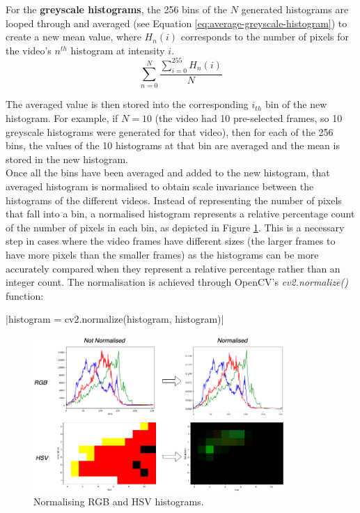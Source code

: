 For the \textbf{greyscale histograms}, the 256 bins of the $N$ generated histograms are looped through and averaged (see Equation \ref{eq:average-greyscale-histogram}) to create a new mean value, where $H_n(i)$ corresponds to the number of pixels for the video's $n^{th}$ histogram at intensity $i$.
\begin{equation}
\label{eq:average-greyscale-histogram}
    \sum_{n=0}^{N} \frac{\sum_{i=0}^{255} H_n(i)}{N}
\end{equation}

The averaged value is then stored into the corresponding $i_{th}$ bin of the new histogram. For example, if $N=10$ (the video had 10 pre-selected frames, so 10 greyscale histograms were generated for that video), then for each of the 256 bins, the values of the 10 histograms at that bin are averaged and the mean is stored in the new histogram.\\

Once all the bins have been averaged and added to the new histogram, that averaged histogram is normalised to obtain scale invariance between the histograms of the different videos. Instead of representing the number of pixels that fall into a bin, a normalised histogram represents a relative percentage count of the number of pixels in each bin, as depicted in Figure \ref{fig:implementation-normalise-histogram}. This is a necessary step in cases where the video frames have different sizes (the larger frames to have more pixels than the smaller frames) as the histograms can be more accurately compared when they represent a relative percentage rather than an integer count. The normalisation is achieved through OpenCV's \textit{cv2.normalize()} function:

|histogram = cv2.normalize(histogram, histogram)|

\begin{figure}[h] 
\centerline{\includegraphics[width=0.85\textwidth]{figures/implementation/normalise-histogram.png}}
\caption{\label{fig:implementation-normalise-histogram}Normalising RGB and HSV histograms.}
\end{figure}

